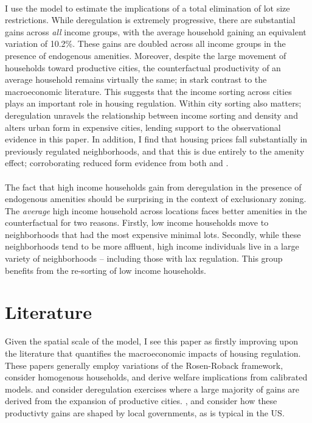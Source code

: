 \documentclass[]{article}
\begin{document}
\paragraph*{}
I use the model to estimate the implications of a total elimination of lot size restrictions. While deregulation is extremely progressive, there are substantial gains across \textit{all} income groups, with the average household gaining an equivalent variation of 10.2\%. These gains are doubled across all income groups in the presence of endogenous amenities. Moreover, despite the large movement of households toward productive cities, the counterfactual productivity of an average household remains virtually the same; in stark contrast to the macroeconomic literature. This suggests that the income sorting across cities plays an important role in housing regulation. Within city sorting also matters; deregulation unravels the relationship between income sorting and density and alters urban form in expensive cities, lending support to the observational evidence in this paper. In addition, I find that housing prices fall substantially in previously regulated neighborhoods, and that this is due entirely to the amenity effect; corroborating reduced form evidence from both \cite{kulka} and \cite{Song}. 

\paragraph*{}
The fact that high income households gain from deregulation in the presence of endogenous amenities should be surprising in the context of exclusionary zoning. The \textit{average} high income household across locations faces better amenities in the counterfactual for two reasons. Firstly, low income households move to neighborhoods that had the most expensive minimal lots. Secondly, while these neighborhoods tend to be more affluent, high income individuals live in a large variety of neighborhoods -- including those with lax regulation. This group benefits from the re-sorting of low income households. 


\section{Literature}
Given the spatial scale of the model, I see this paper as firstly improving upon the literature that quantifies the macroeconomic impacts of housing regulation. These papers generally employ variations of the Rosen-Roback framework, consider homogenous households, and derive welfare implications from calibrated models. \cite{hseihmoretti} and \cite{hop} consider deregulation exercises where a large majority of gains are derived from the expansion of productive cities. \cite{durantonpugaurbgrowth}, \cite{bunten} and \cite{parkho} consider how these productivty gains are shaped by local governments, as is typical in the US. 
\end{document}
